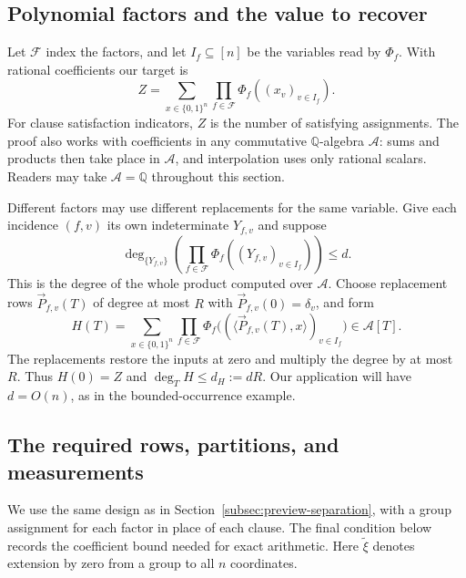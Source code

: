 \documentclass[11pt,reqno]{amsart}
\numberwithin{equation}{section}
\theoremstyle{definition}\newtheorem{definition}[theorem]{Definition}
\theoremstyle{remark}\newtheorem{remark}[theorem]{Remark}
\renewcommand{\le}{\leqslant}
\begin{document}
\subsection{Polynomial factors and the value to recover}
\label{subsec:product-interface}
Let $\mathcal F$ index the factors, and let $I_f\subseteq[n]$ be the
variables read by $\Phi_f$. With rational coefficients our target is
\begin{equation}\label{eq:general-product-sum}
 Z=\sum_{x\in\{0,1\}^n}\prod_{f\in\mathcal F}\Phi_f((x_v)_{v\in I_f}).
\end{equation}
For clause satisfaction indicators, $Z$ is the number of satisfying
assignments. The proof also works with coefficients in any commutative
$\mathbb Q$-algebra $\mathcal A$: sums and products then take place in
$\mathcal A$, and interpolation uses only rational scalars. Readers may
take $\mathcal A=\mathbb Q$ throughout this section.

Different factors may use different replacements for the same variable.
Give each incidence $(f,v)$ its own indeterminate $Y_{f,v}$ and suppose
\begin{equation}\label{eq:general-product-degree}
 \deg_{\{Y_{f,v}\}}\!
    \left(\prod_{f\in\mathcal F}\Phi_f((Y_{f,v})_{v\in I_f})\right)\le d .
\end{equation}
This is the degree of the whole product computed over $\mathcal A$.
Choose replacement rows $\vec P_{f,v}(T)$ of degree at most $R$ with
$\vec P_{f,v}(0)=\delta_v$, and form
\begin{equation}\label{eq:general-count-polynomial}
 H(T)=\sum_{x\in\{0,1\}^n}\prod_{f\in\mathcal F}
   \Phi_f\bigl((\langle\vec P_{f,v}(T),x\rangle)_{v\in I_f}\bigr)
   \in\mathcal A[T].
\end{equation}
The replacements restore the inputs at zero and multiply the degree by
at most $R$. Thus $H(0)=Z$ and $\deg_T H\le d_H:=dR$. Our application
will have $d=O(n)$, as in the bounded-occurrence example.

\subsection{The required rows, partitions, and measurements}
\label{subsec:layout-interface}
We use the same design as in Section~\ref{subsec:preview-separation},
with a group assignment for each factor in place of each clause.
The final condition below records the coefficient bound needed for
exact arithmetic. Here $\widetilde\xi$ denotes extension by zero
from a group to all $n$ coordinates.
\end{document}
